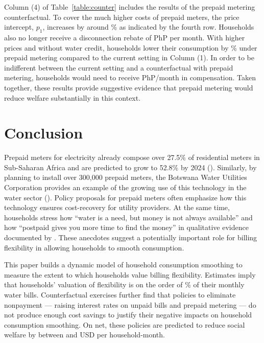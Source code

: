 \documentclass[12pt]{article}
\begin{document}
Column (4) of Table~\ref{table:counter} includes the results of the prepaid metering counterfactual.  To cover the much higher costs of prepaid meters, the price intercept, $p_1$, increases by around \unskip\% as indicated by the fourth row.  Households also no longer receive a disconnection rebate of PhP per month.  With higher prices and without water credit, households lower their consumption by \unskip\% under prepaid metering compared to the current setting in Column (1).  In order to be indifferent between the current setting and a counterfactual with prepaid metering, households would need to receive PhP/month in compensation.  Taken together, these results provide suggestive evidence that prepaid metering would reduce welfare substantially in this context.


\section{Conclusion}\label{section:conclusion}

Prepaid meters for electricity already compose over 27.5\% of residential meters in Sub-Saharan Africa and are predicted to grow to 52.8\% by 2024 (\cite{northeast2014}).  Similarly, by planning to install over 300,000 prepaid meters, the Botswana Water Utilities Corporation provides an example of the growing use of this technology in the water sector (\cite{heymans2014limits}).  Policy proposals for prepaid meters often emphasize how this technology ensures cost-recovery for utility providers.  At the same time, households stress how ``water is a need, but money is not always available'' and  how ``postpaid gives you more time to find the money'' in qualitative evidence documented by \cite{heymans2014limits}.  These anecdotes suggest a potentially important role for billing flexibility in allowing households to smooth consumption.  

This paper builds a dynamic model of household consumption smoothing to measure the extent to which households value billing flexibility.  Estimates imply that households' valuation of flexibility is on the order of \unskip\% of their monthly water bills.  Counterfactual exercises further find that policies to eliminate nonpayment --- raising interest rates on unpaid bills and prepaid metering --- do not produce enough cost savings to justify their negative impacts on household consumption smoothing.  On net, these policies are predicted to reduce social welfare by between and USD per household-month.  
\end{document}
